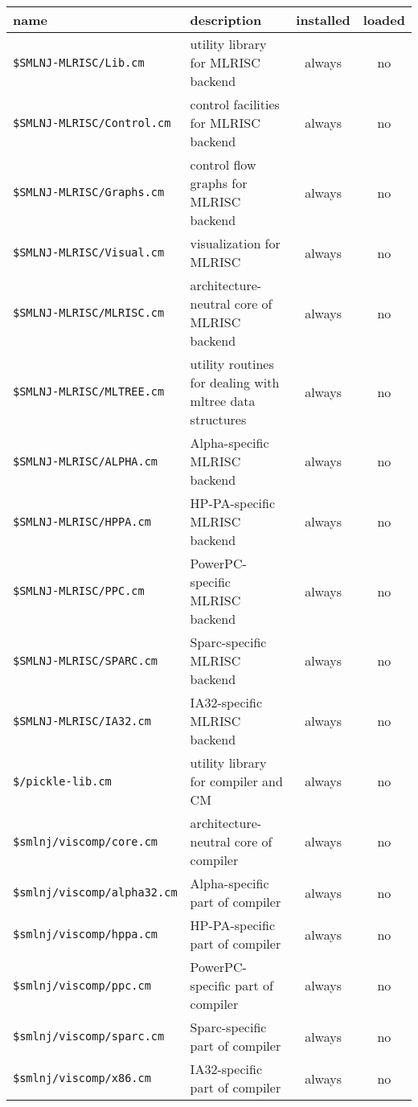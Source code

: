 \begin{small}
\begin{center}
\begin{tabular}{p{2.5in}||p{2.6in}|c|c}
name & description & installed & loaded \\
\hline\hline
{\tt \$SMLNJ-MLRISC/Lib.cm} & utility library for MLRISC backend & always &
no \\
\hline
{\tt \$SMLNJ-MLRISC/Control.cm} & control facilities for MLRISC backend &
always & no \\
\hline
{\tt \$SMLNJ-MLRISC/Graphs.cm} & control flow graphs for MLRISC backend &
always & no \\
\hline
{\tt \$SMLNJ-MLRISC/Visual.cm} & visualization for MLRISC & always & no \\
\hline
{\tt \$SMLNJ-MLRISC/MLRISC.cm} & architecture-neutral core of MLRISC backend
& always & no \\
\hline
{\tt \$SMLNJ-MLRISC/MLTREE.cm} & utility routines for dealing with
mltree data structures & always & no \\
\hline
{\tt \$SMLNJ-MLRISC/ALPHA.cm} & Alpha-specific MLRISC backend & always & no \\
\hline
{\tt \$SMLNJ-MLRISC/HPPA.cm} & HP-PA-specific MLRISC backend & always & no \\
\hline
{\tt \$SMLNJ-MLRISC/PPC.cm} & PowerPC-specific MLRISC backend & always & no \\
\hline
{\tt \$SMLNJ-MLRISC/SPARC.cm} & Sparc-specific MLRISC backend & always & no \\
\hline
{\tt \$SMLNJ-MLRISC/IA32.cm} & IA32-specific MLRISC backend & always & no \\
\hline\hline
{\tt \$/pickle-lib.cm} & utility library for compiler and CM & always & no \\
\hline
{\tt \$smlnj/viscomp/core.cm} & architecture-neutral core of compiler
& always & no \\
\hline
{\tt \$smlnj/viscomp/alpha32.cm} & Alpha-specific part of compiler &
always & no \\
\hline
{\tt \$smlnj/viscomp/hppa.cm} & HP-PA-specific part of compiler &
always & no \\
\hline
{\tt \$smlnj/viscomp/ppc.cm} & PowerPC-specific part of compiler &
always & no \\
\hline
{\tt \$smlnj/viscomp/sparc.cm} & Sparc-specific part of compiler &
always & no \\
\hline
{\tt \$smlnj/viscomp/x86.cm} & IA32-specific part of compiler & always
& no \\

\end{tabular}
\end{center}
\end{small}
